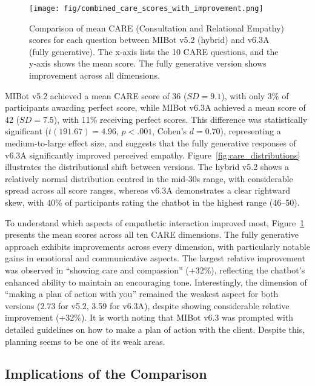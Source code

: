 \begin{figure}[htbp]
    \centering
    \texttt{[image: fig/combined\_care\_scores\_with\_improvement.png]}
    \caption[Comparison of Mean CARE Scores per Question]{Comparison of mean CARE (Consultation and Relational Empathy) scores for each question between MIBot v5.2 (hybrid) and v6.3A (fully generative). The x-axis lists the 10 CARE questions, and the y-axis shows the mean score. The fully generative version shows improvement across all dimensions.}
    \label{fig:care_questions}
\end{figure}

 MIBot v5.2 achieved a mean CARE score of 36 ($SD = 9.1$), with only 3\% of participants awarding perfect score, while MIBot v6.3A achieved a mean score of 42 ($SD = 7.5$), with 11\% receiving perfect scores. This difference was statistically significant ($t(191.67) = 4.96$, $p < .001$, Cohen's $d = 0.70$), representing a medium-to-large effect size, and suggests that the fully generative  responses of v6.3A significantly improved perceived empathy. Figure~\ref{fig:care_distributions} illustrates the distributional shift between versions. The hybrid v5.2 shows a relatively normal distribution centred in the mid-30s range, with considerable spread across all score ranges, whereas v6.3A demonstrates a clear rightward skew, with 40\% of participants rating the chatbot in the highest range (46--50).

To understand which aspects of empathetic interaction improved most, Figure~\ref{fig:care_questions} presents the mean scores across all ten CARE dimensions. The fully generative approach exhibits improvements across every dimension, with particularly notable gains in emotional and communicative aspects. The largest relative improvement was observed in ``showing care and compassion'' (+32\%), reflecting the chatbot's enhanced ability to maintain an encouraging tone. Interestingly, the dimension of ``making a plan of action with you'' remained the weakest aspect for both versions (2.73 for v5.2, 3.59 for v6.3A), despite showing considerable relative improvement (+32\%). It is worth noting that MIBot v6.3 was prompted with detailed guidelines on how to make a plan of action with the client. Despite this, planning seems to be one of its weak areas.



\subsection{Implications of the Comparison}

